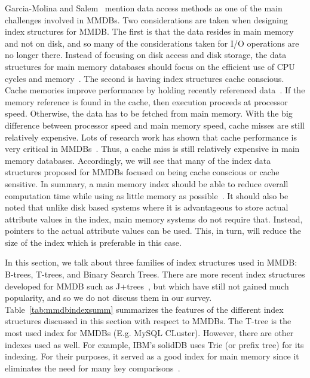 \documentclass[12pt,a4paper]{article}
\begin{document}
Garcia-Molina and Salem~\cite{garcia1992main} mention data access methods as one of the main challenges involved in MMDBs. Two considerations are taken when
designing index structures for MMDB. The first is that the data resides in main memory and not on disk, and so many of the
considerations taken for I/O operations are no longer there. Instead of focusing on disk access and disk storage, the data structures for main memory
databases should focus on the efficient use of CPU cycles and memory~\cite{lehman1986study}. The second is having index structures cache conscious. Cache
memories improve performance by holding recently referenced data~\cite{smith1982cache}. If the memory reference is found in the cache, then execution proceeds
at processor speed. Otherwise, the data has to be fetched from main memory. With the big difference between processor speed and main memory speed, cache misses
are still relatively expensive. Lots of research work has shown that cache performance is very critical in MMDBs~\cite{boncz1999database,rao1999cache}. Thus, a
cache miss is still relatively expensive in main memory databases.
Accordingly, we will see that many of the index data structures proposed for MMDBs focused on being cache conscious or cache sensitive. In
summary, a main memory index should be able to reduce overall computation time while using as little memory as possible~\cite{lehman1986study}. It should also
be noted that unlike disk based systems where it is advantageous to store actual attribute values in the index, main memory systems do not require that.
Instead, pointers to the actual attribute values can be used. This, in turn, will reduce the size of the index which is preferable in this case.

In this section, we talk about three families of index structures used in MMDB: B-trees, T-trees, and Binary Search Trees. There are more recent index
structures developed for MMDB such as J+trees~\cite{luan2009prefetching}, but which have still not gained much popularity, and so we do not discuss them in our
survey. Table~\ref{tab:mmdbindexsumm} summarizes the features of the different index structures discussed in this section with respect to MMDBs. The T-tree is
the most used index for MMDBs (E.g. MySQL CLuster). However, there are other indexes used as well. For example, IBM's solidDB uses Trie (or prefix tree) for its
indexing. For their purposes, it served as a good index for main memory since it eliminates the need for many key comparisons~\cite{ibmsoliddb}.
\end{document}
